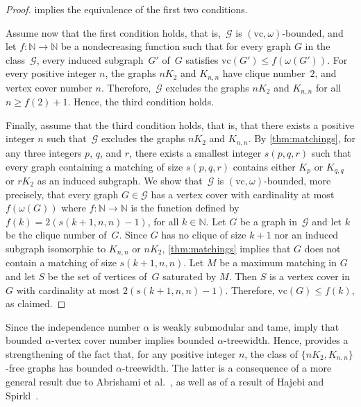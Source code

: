 \documentclass[11pt]{article}
\newcommand{\vc}{\mathrm{vc}}
\theoremstyle{plain}
\theoremstyle{definition}
\theoremstyle{remark}
\numberwithin{equation}{section}
\begin{document}
\begin{proof}
 implies the equivalence of the first two conditions.

Assume now that the first condition holds, that is,~$\mathcal{G}$ is $(\vc,\omega)$-bounded, and let $f:\mathbb{N}\to \mathbb{N}$ be a nondecreasing function such that for every graph $G$ in the class~$\mathcal{G}$, every induced subgraph~$G'$ of~$G$ satisfies $\vc(G')\le f(\omega(G'))$.
For every positive integer $n$, the graphs $nK_2$ and $K_{n,n}$ have clique number~$2$, and vertex cover number $n$.
Therefore,~$\mathcal{G}$ excludes the graphs $nK_2$ and $K_{n,n}$ for all $n\ge f(2)+1$.
Hence, the third condition holds.

Finally, assume that the third condition holds, that is, that there exists a positive integer $n$ such that~$\mathcal{G}$ excludes the graphs $nK_2$ and $K_{n,n}$.
By \cref{thm:matchings}, for any three integers $p$, $q$, and $r$, there exists a smallest integer $s(p,q,r)$ such that every graph containing a matching of size $s(p,q,r)$ contains either $K_p$ or $K_{q,q}$ or $rK_2$ as an induced subgraph.
We show that~$\mathcal{G}$ is $(\vc,\omega)$-bounded, more precisely, that every graph $G\in \mathcal{G}$ has a vertex cover with cardinality at most $f(\omega(G))$ where $f:\mathbb{N}\to \mathbb{N}$ is the function defined by $f(k) = 2(s(k+1,n,n)-1)$, for all $k\in \mathbb{N}$.
Let $G$ be a graph in~$\mathcal{G}$ and let $k$ be the clique number of~$G$.
Since $G$ has no clique of size $k+1$ nor an induced subgraph isomorphic to $K_{n,n}$ or $nK_2$, \cref{thm:matchings} implies that $G$ does not contain a matching of size $s(k+1,n,n)$.
Let $M$ be a maximum matching in $G$ and let $S$ be the set of vertices of~$G$ saturated by $M$.
Then $S$ is a vertex cover in $G$ with cardinality at most $2(s(k+1,n,n)-1)$.
Therefore, $\vc(G)\le f(k)$, as claimed.
\end{proof}

Since the independence number $\alpha$ is weakly submodular and tame,  imply that bounded $\alpha$-vertex cover number implies bounded $\alpha$-treewidth.
Hence,  provides a strengthening of the fact that, for any positive integer $n$, the class of $\{nK_2,K_{n,n}\}$-free graphs has bounded $\alpha$-treewidth.
The latter is a consequence of a more general result due to Abrishami et al.~\cite[Theorem~1.1]{abrishami2024excludingcliquebicliquegraphs}, as well as of a result of Hajebi and Spirkl~\cite[Theorem~1.4]{hajebi2026treealphaexcludingfinitelygraphs}.
\end{document}
